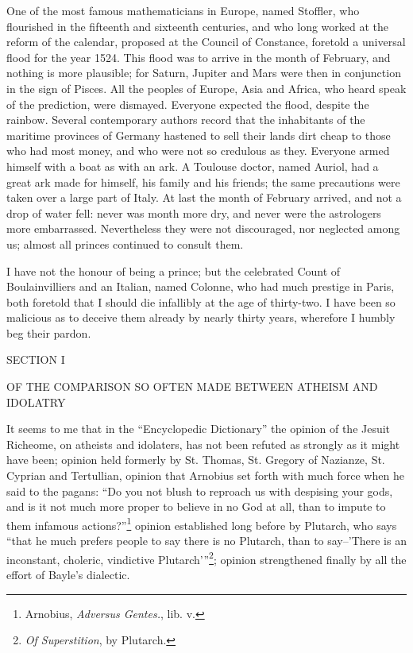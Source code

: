 One of the most famous mathematicians in Europe, named Stoffler, who
flourished in the fifteenth and sixteenth centuries, and who long worked
at the reform of the calendar, proposed at the Council of Constance,
foretold a universal flood for the year 1524. This flood was to arrive
in the month of February, and nothing is more plausible; for Saturn,
Jupiter and Mars were then in conjunction in the sign of Pisces. All the
peoples of Europe, Asia and Africa, who heard speak of the prediction,
were dismayed. Everyone expected the flood, despite the rainbow. Several
contemporary authors record that the inhabitants of the maritime
provinces of Germany hastened to sell their lands dirt cheap to those
who had most money, and who were not so credulous as they. Everyone
armed himself with a boat as with an ark. A Toulouse doctor, named
Auriol, had a great ark made for himself, his family and his friends;
the same precautions were taken over a large part of Italy. At last the
month of February arrived, and not a drop of water fell: never was month
more dry, and never were the astrologers more embarrassed. Nevertheless
they were not discouraged, nor neglected among us; almost all princes
continued to consult them.

I have not the honour of being a prince; but the celebrated Count of
Boulainvilliers and an Italian, named Colonne, who had much prestige in
Paris, both foretold that I should die infallibly at the age of
thirty-two. I have been so malicious as to deceive them already by
nearly thirty years, wherefore I humbly beg their pardon.






SECTION I

OF THE COMPARISON SO OFTEN MADE BETWEEN ATHEISM AND IDOLATRY

It seems to me that in the \enquote{Encyclopedic Dictionary} the opinion of the
Jesuit Richeome, on atheists and idolaters, has not been refuted as
strongly as it might have been; opinion held formerly by St. Thomas, St.
Gregory of Nazianze, St. Cyprian and Tertullian, opinion that Arnobius
set forth with much force when he said to the pagans: \enquote{Do you not blush
to reproach us with despising your gods, and is it not much more proper
to believe in no God at all, than to impute to them infamous
actions?}\footnote{Arnobius, \textit{Adversus Gentes.}, lib. v.} opinion established long before by Plutarch, who says \enquote{that
he much prefers people to say there is no Plutarch, than to say--'There
is an inconstant, choleric, vindictive Plutarch'}\footnote{\textit{Of Superstition}, by Plutarch.}; opinion
strengthened finally by all the effort of Bayle's dialectic.


